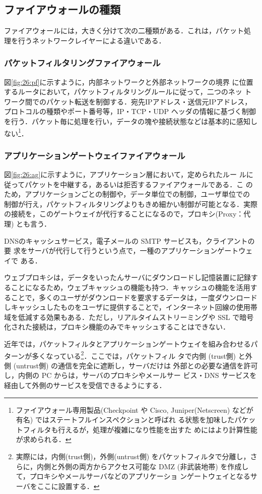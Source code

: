 \subsection{ファイアウォールの種類}
ファイアウォールには，大きく分けて次の二種類がある．これは，パケット処
理を行うネットワークレイヤーによる違いである．

\subsubsection{パケットフィルタリングファイアウォール}
図\ref{fig:26:pf}に示すように，内部ネットワークと外部ネットワークの境界
に位置するルータにおいて，パケットフィルタリングルールに従って，二つのネッ
トワーク間でのパケット転送を制御する．宛先IPアドレス・送信元IPアドレス，
プロトコルの種類やポート番号等，IP・TCP・UDP ヘッダの情報に基づく制御
を行う．パケット毎に処理を行い，データの塊や接続状態などは基本的に感知し
ない\footnote{ファイアウォール専用製品(Checkpoint や Cisco,
Juniper(Netscreen) などが有名) ではステートフルインスペクションと呼ばれ
る状態を加味したパケットフィルタも行えるが，処理が複雑になり性能を出すた
めにはより計算性能が求められる．}．


\subsubsection{アプリケーションゲートウェイファイアウォール}
図\ref{fig:26:ag}に示すように，アプリケーション層において，定められたルー
ルに従ってパケットを中継する，あるいは拒否するファイアウォールである．こ
のため，アプリケーションごとの制御や，データ単位での制御，ユーザ単位での
制御が行え，パケットフィルタリングよりもきめ細かい制御が可能となる．実際
の接続を，このゲートウェイが代行することになるので，プロキシ(Proxy：代理)
とも言う．

DNSのキャッシュサービス，電子メールの SMTP サービスも，クライアントの要
求をサーバが代行して行うという点で，一種のアプリケーションゲートウェイで
ある．

ウェブプロキシは，データをいったんサーバにダウンロードし記憶装置に記録す
ることになるため，ウェブキャッシュの機能も持つ．キャッシュの機能を活用す
ることで，多くのユーザがダウンロードを要求するデータは，一度ダウンロード
しキャッシュしたものをユーザに提供することで，インターネット回線の使用帯
域を低減する効果もある．ただし，リアルタイムストリーミングや SSL で暗号
化された接続は，プロキシ機能のみでキャッシュすることはできない．

近年では，パケットフィルタとアプリケーションゲートウェイを組み合わせるパ
ターンが多くなっている\footnote{実際には，内側(trust側)，外側(untrust側)
をパケットフィルタで分離し，さらに，内側と外側の両方からアクセス可能な
DMZ (非武装地帯) を作成して，プロキシやメールサーバなどのアプリケーショ
ンゲートウェイとなるサーバをここに設置する．}．ここでは，パケットフィル
タで内側 (trust側) と外側 (untrust側) の通信を完全に遮断し，サーバだけは
外部との必要な通信を許可し，内側の PC からは，サーバのプロキシやメールサー
ビス・DNS サービスを経由して外側のサービスを受信できるようにする．

